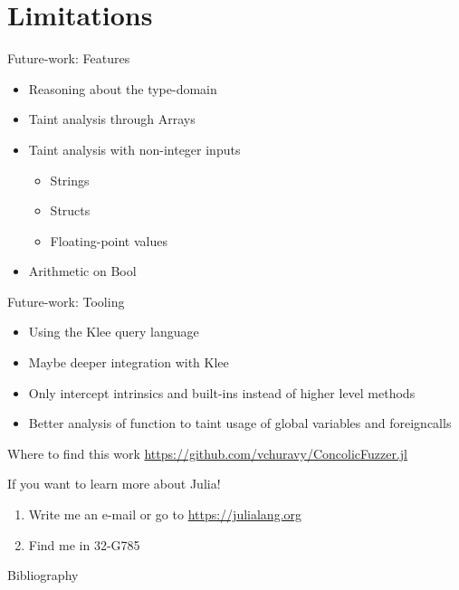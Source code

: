 \documentclass{beamer}
\begin{document}
  \section{Limitations}
  \begin{frame}{Future-work: Features}
      \begin{itemize}[<+->]
          \item Reasoning about the type-domain
          \item Taint analysis through Arrays
          \item Taint analysis with non-integer inputs
            \begin{itemize}
                \item Strings
                \item Structs
                \item Floating-point values
            \end{itemize}
        \item Arithmetic on Bool
      \end{itemize}
  \end{frame}
  \begin{frame}{Future-work: Tooling}
      \begin{itemize}[<+->]
          \item Using the Klee query language
          \item Maybe deeper integration with Klee\cite{Cadar_Dunbar_Engler}
          \item Only intercept intrinsics and built-ins instead of higher
                level methods
          \item Better analysis of function to taint usage of global
                variables and foreigncalls
      \end{itemize}
  \end{frame}
  \begin{frame}
      \begin{block}{Where to find this work}
          \url{https://github.com/vchuravy/ConcolicFuzzer.jl}
      \end{block}
      \pause
      \begin{block}{If you want to learn more about Julia!}
          \begin{enumerate}
              \item Write me an e-mail or go to \url{https://julialang.org}
              \item Find me in 32-G785
            \end{enumerate}
      \end{block}
  \end{frame}
  \begin{frame}[allowframebreaks]{Bibliography}
      \printbibliography
\end{frame}
\end{document}
